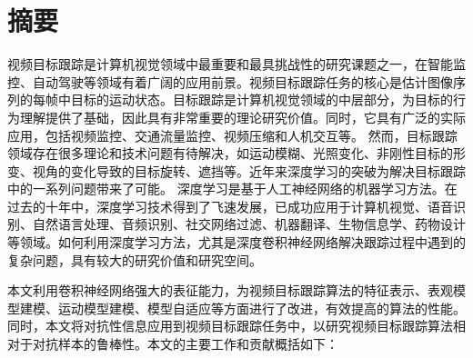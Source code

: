 \maketitle%
\MAKETITLE%
\makedeclaration%
\intobmk\chapter*{摘\quad 要}%
\setcounter{page}{1}%

视频目标跟踪是计算机视觉领域中最重要和最具挑战性的研究课题之一，在智能监控、自动驾驶等领域有着广阔的应用前景。视频目标跟踪任务的核心是估计图像序列的每帧中目标的运动状态。目标跟踪是计算机视觉领域的中层部分，为目标的行为理解提供了基础，因此具有非常重要的理论研究价值。同时，它具有广泛的实际应用，包括视频监控、交通流量监控、视频压缩和人机交互等。
然而，目标跟踪领域存在很多理论和技术问题有待解决，如运动模糊、光照变化、非刚性目标的形变、视角的变化导致的目标旋转、遮挡等。近年来深度学习的突破为解决目标跟踪中的一系列问题带来了可能。
深度学习是基于人工神经网络的机器学习方法。在过去的十年中，深度学习技术得到了飞速发展，已成功应用于计算机视觉、语音识别、自然语言处理、音频识别、社交网络过滤、机器翻译、生物信息学、药物设计等领域。如何利用深度学习方法，尤其是深度卷积神经网络解决跟踪过程中遇到的复杂问题，具有较大的研究价值和研究空间。

本文利用卷积神经网络强大的表征能力，为视频目标跟踪算法的特征表示、表观模型建模、运动模型建模、模型自适应等方面进行了改进，有效提高的算法的性能。同时，本文将对抗性信息应用到视频目标跟踪任务中，以研究视频目标跟踪算法相对于对抗样本的鲁棒性。本文的主要工作和贡献概括如下：

